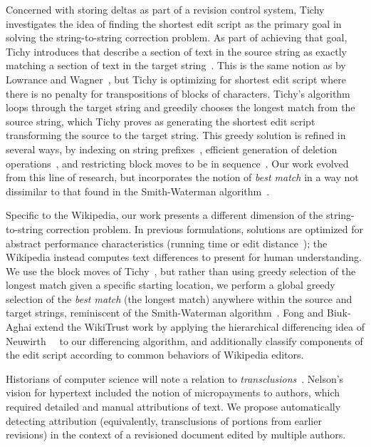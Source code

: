 Concerned with storing deltas as part of a revision control system,
Tichy investigates the idea of finding the shortest edit script as
the primary goal in solving the string-to-string correction problem.
As part of achieving that goal, Tichy introduces 
that describe a section of text in the source string as exactly matching
a section of text in the target string~\cite{Tichy1984}.
This is the same notion as  by
Lowrance and Wagner~\cite{Lowrance1975}, but Tichy is optimizing
for shortest edit script where there is no penalty for transpositions
of blocks of characters.
Tichy's algorithm loops through the target string and greedily chooses
the longest match from the source string, which Tichy proves as
generating the shortest edit script transforming the source to the
target string.
This greedy solution is refined in several ways,
by indexing on string prefixes~\cite{Obst1987},
efficient generation of deletion operations~\cite{Reichenberger1991},
and restricting block moves to be in sequence~\cite{Burns1997}.
Our work evolved from this line of research, but
incorporates the notion of \textit{best match}
in a way not dissimilar to that found in the Smith-Waterman
algorithm~\cite{Smith1981}.

Specific to the Wikipedia, our work presents a different
dimension of the string-to-string correction problem.
In previous formulations, solutions are optimized for abstract
performance characteristics (\eg running time or
edit distance~\cite{Damerau1964,Levenshtein1966});
the Wikipedia instead computes text
differences to present for human understanding.
We use the block moves of Tichy~\cite{Tichy1984}, but rather
than using greedy selection of the longest match given a specific
starting location, we perform a global greedy selection of the
\textit{best match} (\eg the longest match) anywhere within the
source and target strings, reminiscent of the Smith-Waterman
algorithm~\cite{Smith1981}.
Fong and Biuk-Aghai extend the WikiTrust work by applying
the hierarchical differencing idea of
Neuwirth~\etal~\cite{Neuwirth1992} to our differencing algorithm,
and additionally classify components
of the edit script according to common behaviors of Wikipedia editors.

Historians of computer science will note a relation
to \textit{transclusions}~\cite{Nelson81}.
Nelson's vision for hypertext included the notion
of micropayments to authors, which required detailed
and manual attributions of text.
We propose automatically detecting attribution
(equivalently, transclusions of portions from earlier revisions)
in the context of a revisioned document edited
by multiple authors.


